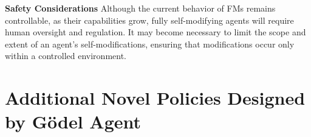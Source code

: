 \documentclass[11pt]{article}
\newcommand{\framework}{Gödel Agent\xspace}
\begin{document}
\noindent\textbf{Safety Considerations} \quad Although the current behavior of FMs remains controllable, as their capabilities grow, fully self-modifying agents will require human oversight and regulation. It may become necessary to limit the scope and extent of an agent's self-modifications, ensuring that modifications occur only within a controlled environment.









\section{Additional Novel Policies Designed by \framework}
\end{document}
